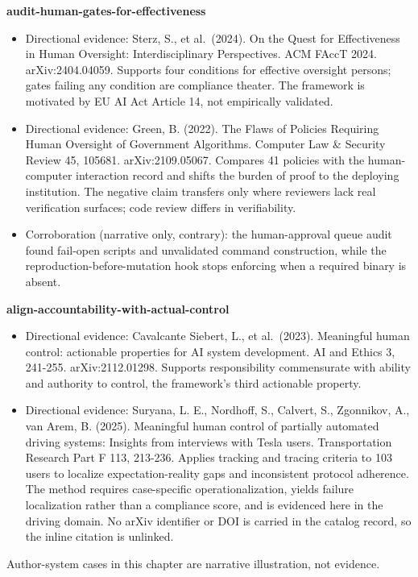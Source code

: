 \textbf{audit-human-gates-for-effectiveness}

\begin{itemize}
\tightlist
\item
  Directional evidence: Sterz, S., et al.~(2024). On the Quest for Effectiveness in Human Oversight: Interdisciplinary Perspectives. ACM FAccT 2024. arXiv:2404.04059. Supports four conditions for effective oversight persons; gates failing any condition are compliance theater. The framework is motivated by EU AI Act Article 14, not empirically validated.
\item
  Directional evidence: Green, B. (2022). The Flaws of Policies Requiring Human Oversight of Government Algorithms. Computer Law \& Security Review 45, 105681. arXiv:2109.05067. Compares 41 policies with the human-computer interaction record and shifts the burden of proof to the deploying institution. The negative claim transfers only where reviewers lack real verification surfaces; code review differs in verifiability.
\item
  Corroboration (narrative only, contrary): the human-approval queue audit found fail-open scripts and unvalidated command construction, while the reproduction-before-mutation hook stops enforcing when a required binary is absent.
\end{itemize}

\textbf{align-accountability-with-actual-control}

\begin{itemize}
\tightlist
\item
  Directional evidence: Cavalcante Siebert, L., et al.~(2023). Meaningful human control: actionable properties for AI system development. AI and Ethics 3, 241-255. arXiv:2112.01298. Supports responsibility commensurate with ability and authority to control, the framework's third actionable property.
\item
  Directional evidence: Suryana, L. E., Nordhoff, S., Calvert, S., Zgonnikov, A., van Arem, B. (2025). Meaningful human control of partially automated driving systems: Insights from interviews with Tesla users. Transportation Research Part F 113, 213-236. Applies tracking and tracing criteria to 103 users to localize expectation-reality gaps and inconsistent protocol adherence. The method requires case-specific operationalization, yields failure localization rather than a compliance score, and is evidenced here in the driving domain. No arXiv identifier or DOI is carried in the catalog record, so the inline citation is unlinked.
\end{itemize}

Author-system cases in this chapter are narrative illustration, not evidence.
